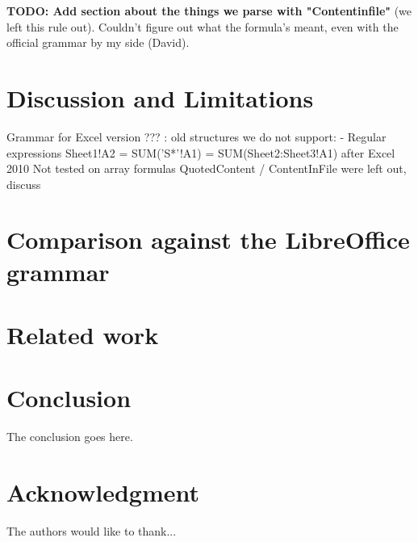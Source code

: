 \documentclass[conference]{IEEEtran}
\newcommand{\todo}[1]{\textbf{TODO: #1}}
\begin{document}
\todo{Add section about the things we parse with "Contentinfile"} (we left this rule out). Couldn't figure out what the formula's meant, even with the official grammar by my side (David).

\section{Discussion and Limitations}
Grammar for Excel version ??? : old structures we do not support:
- Regular expressions Sheet1!A2 = SUM('S*'!A1) = SUM(Sheet2:Sheet3!A1) after Excel 2010
Not tested on array formulas
QuotedContent / ContentInFile were left out, discuss

\section{Comparison against the LibreOffice grammar}

\section{Related work}

\section{Conclusion}
The conclusion goes here.


\section*{Acknowledgment}
The authors would like to thank...




\end{document}
